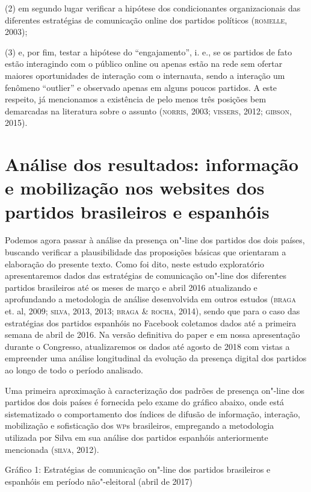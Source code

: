 (2) em segundo lugar verificar a hipótese dos condicionantes
organizacionais das diferentes estratégias de comunicação online dos
partidos políticos (\textsc{romelle}, 2003);

(3) e, por fim, testar a hipótese do ``engajamento'', i. e., se os
partidos de fato estão interagindo com o público online ou apenas estão
na rede sem ofertar maiores oportunidades de interação com o internauta,
sendo a interação um fenômeno ``outlier'' e observado apenas em alguns
poucos partidos. A este respeito, já mencionamos a existência de pelo
menos três posições bem demarcadas na literatura sobre o assunto
(\textsc{norris}, 2003; \textsc{vissers}, 2012; \textsc{gibson}, 2015).

\section{Análise dos resultados: informação e mobilização nos websites dos
partidos brasileiros e espanhóis}

Podemos agora passar à análise da presença on"-line dos partidos dos dois
países, buscando verificar a plausibilidade das proposições básicas que
orientaram a elaboração do presente texto. Como foi dito, neste estudo
exploratório apresentaremos dados das estratégias de comunicação on"-line
dos diferentes partidos brasileiros até os meses de março e abril 2016
atualizando e aprofundando a metodologia de análise desenvolvida em
outros estudos (\textsc{braga} et. al, 2009; \textsc{silva}, 2013, 2013; \textsc{braga} \& \textsc{rocha},
2014), sendo que para o caso das estratégias dos partidos espanhóis no
Facebook coletamos dados até a primeira semana de abril de 2016. Na
versão definitiva do paper e em nossa apresentação durante o Congresso,
atualizaremos os dados até agosto de 2018 com vistas a empreender uma
análise longitudinal da evolução da presença digital dos partidos ao
longo de todo o período analisado.

Uma primeira aproximação à caracterização dos padrões de presença
on"-line dos partidos dos dois países é fornecida pelo exame do gráfico
abaixo, onde está sistematizado o comportamento dos índices de difusão
de informação, interação, mobilização e sofisticação dos \textsc{wp}s
brasileiros, empregando a metodologia utilizada por Silva em sua análise
dos partidos espanhóis anteriormente mencionada (\textsc{silva}, 2012).

\pagebreak

Gráfico 1: Estratégias de comunicação on"-line dos partidos brasileiros e
espanhóis em período não"-eleitoral (abril de 2017)

